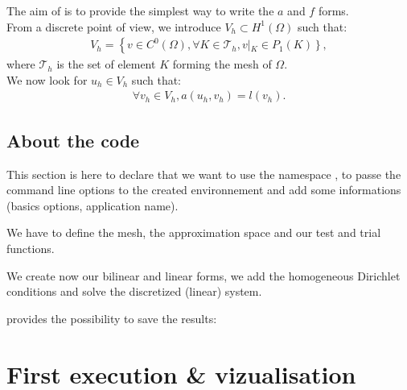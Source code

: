 The aim of \feel is to provide the simplest way to write the $a$ and $f$ forms.\\

From a discrete point of view, we introduce $V_h\subset H^1\left( \Omega \right)$ such that:
\begin{equation}\nonumber
  \begin{aligned}
V_h = \left\{ v \in C^0\left( \Omega \right), \forall K\in \mathcal{T}_h, \right.v\left|_K \in P_1\left( K \right) \right\},
    \end{aligned}
  \end{equation}
where $\mathcal{T}_h$ is the set of element $K$ forming the mesh of $\Omega$. \\
We now look for $u_h \in V_h$ such that:
\begin{equation}\nonumber
  \begin{aligned}
    \forall v_h\in V_h, a\left( u_h,v_h \right)=l\left( v_h \right).
    \end{aligned}
  \end{equation}

\subsection{About the code}
\label{sec:about-code}

This section is here to declare that we want to use the namespace \feel, to
passe the command line options to the created environnement and add some
informations (basics \feel options, application name).

We have to define the mesh, the approximation space and our test and trial
functions.

We create now our bilinear and linear forms, we add the homogeneous Dirichlet
conditions and solve the discretized (linear) system.

\feel provides the possibility to save the results:



\section{First execution \& vizualisation}
\label{sec:first-execution}

